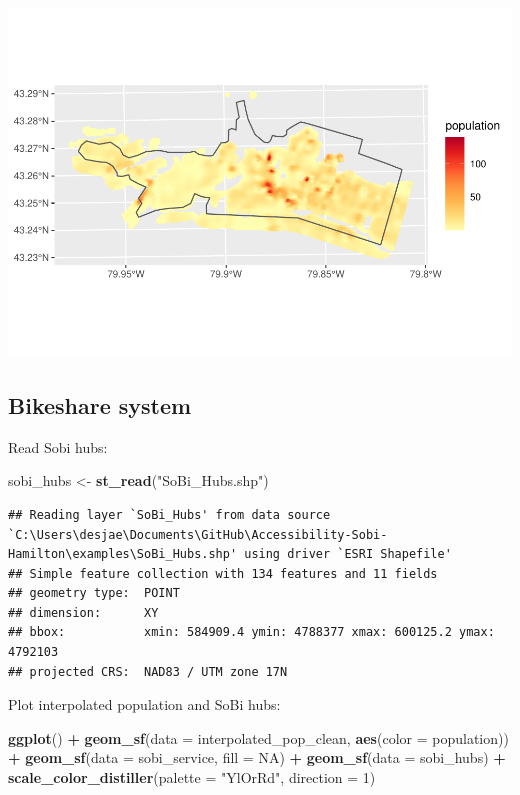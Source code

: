 \documentclass[
]{article}
\newenvironment{Shaded}{\begin{snugshade}}{\end{snugshade}}
\newcommand{\DataTypeTok}[1]{\textcolor[rgb]{0.13,0.29,0.53}{#1}}
\newcommand{\DecValTok}[1]{\textcolor[rgb]{0.00,0.00,0.81}{#1}}
\newcommand{\KeywordTok}[1]{\textcolor[rgb]{0.13,0.29,0.53}{\textbf{#1}}}
\newcommand{\NormalTok}[1]{#1}
\newcommand{\OperatorTok}[1]{\textcolor[rgb]{0.81,0.36,0.00}{\textbf{#1}}}
\newcommand{\OtherTok}[1]{\textcolor[rgb]{0.56,0.35,0.01}{#1}}
\newcommand{\StringTok}[1]{\textcolor[rgb]{0.31,0.60,0.02}{#1}}
\begin{document}
\includegraphics{00-Data-Processing-Example_files/figure-latex/unnamed-chunk-85-1.pdf}

\hypertarget{bikeshare-system}{%
\subsection{Bikeshare system}\label{bikeshare-system}}

Read Sobi hubs:

\begin{Shaded}
\begin{Highlighting}[]
\NormalTok{sobi_hubs <-}\StringTok{ }\KeywordTok{st_read}\NormalTok{(}\StringTok{"SoBi_Hubs.shp"}\NormalTok{)}
\end{Highlighting}
\end{Shaded}

\begin{verbatim}
## Reading layer `SoBi_Hubs' from data source `C:\Users\desjae\Documents\GitHub\Accessibility-Sobi-Hamilton\examples\SoBi_Hubs.shp' using driver `ESRI Shapefile'
## Simple feature collection with 134 features and 11 fields
## geometry type:  POINT
## dimension:      XY
## bbox:           xmin: 584909.4 ymin: 4788377 xmax: 600125.2 ymax: 4792103
## projected CRS:  NAD83 / UTM zone 17N
\end{verbatim}

Plot interpolated population and SoBi hubs:

\begin{Shaded}
\begin{Highlighting}[]
\KeywordTok{ggplot}\NormalTok{() }\OperatorTok{+}\StringTok{ }
\StringTok{  }\KeywordTok{geom_sf}\NormalTok{(}\DataTypeTok{data =}\NormalTok{ interpolated_pop_clean,}
          \KeywordTok{aes}\NormalTok{(}\DataTypeTok{color =}\NormalTok{ population)) }\OperatorTok{+}
\StringTok{  }\KeywordTok{geom_sf}\NormalTok{(}\DataTypeTok{data =}\NormalTok{ sobi_service,}
          \DataTypeTok{fill =} \OtherTok{NA}\NormalTok{) }\OperatorTok{+}
\StringTok{  }\KeywordTok{geom_sf}\NormalTok{(}\DataTypeTok{data =}\NormalTok{ sobi_hubs) }\OperatorTok{+}
\StringTok{  }\KeywordTok{scale_color_distiller}\NormalTok{(}\DataTypeTok{palette =} \StringTok{"YlOrRd"}\NormalTok{, }
                        \DataTypeTok{direction =} \DecValTok{1}\NormalTok{)}
\end{Highlighting}
\end{Shaded}
\end{document}
